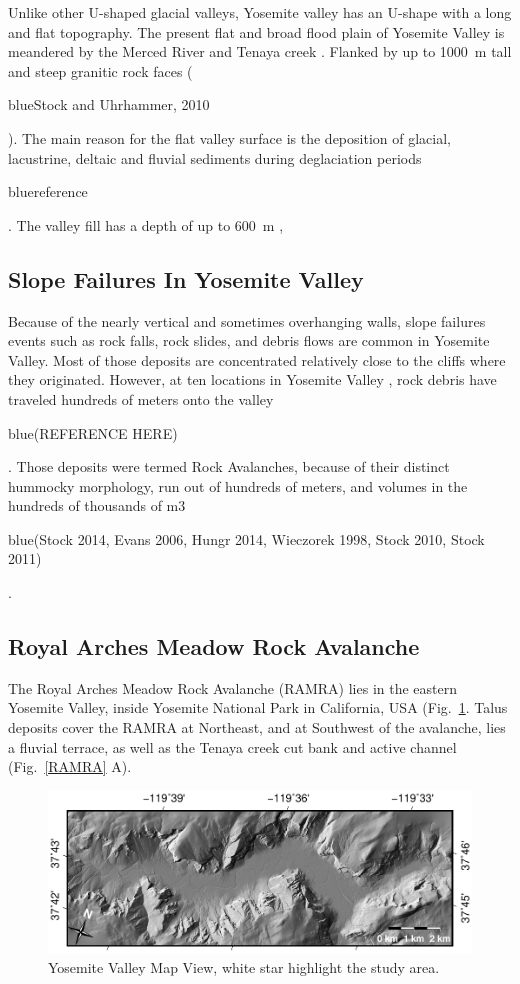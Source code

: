 \documentclass[5p]{elsarticle}
\newcommand{\COMON}{\begin{color}{blue}}
\newcommand{\COMOFF}{\end{color}}
\begin{document}
Unlike other U-shaped glacial valleys, Yosemite valley has an U-shape with a long and flat topography. The present flat and broad flood plain of Yosemite Valley is meandered by the Merced River and Tenaya creek \cite{Wieczorek+1996}. Flanked by up to \SI{1000}{m} tall and steep granitic rock faces (\COMON Stock and Uhrhammer, 2010 \COMOFF). The main reason for the flat valley surface is the deposition of glacial, lacustrine, deltaic and fluvial sediments during deglaciation periods \COMON reference \COMOFF. The valley fill has a depth of up to \SI{600}{m} \cite{gutenberg1956seismic},


    
\subsection{Slope Failures In Yosemite Valley}

Because of  the nearly vertical and sometimes overhanging walls, slope failures events such as rock falls, rock slides, and debris flows are common in Yosemite Valley. Most of those deposits are concentrated relatively close to the cliffs where they originated. However, at ten locations in Yosemite Valley , rock debris have traveled hundreds of meters onto the valley \COMON(REFERENCE HERE)\COMOFF. Those deposits were termed Rock Avalanches, because of their distinct hummocky morphology, run out of hundreds of meters, and volumes in the hundreds of thousands of m3 \COMON(Stock 2014, Evans 2006,  Hungr 2014, Wieczorek 1998, Stock 2010, Stock 2011)\COMOFF. 


\subsection{Royal Arches Meadow Rock Avalanche}\label{sec:introRAMRA}

The Royal Arches Meadow Rock Avalanche (RAMRA) lies in the eastern Yosemite Valley, inside Yosemite National Park in California, USA (Fig.~\ref{Study_Area}. Talus deposits cover the RAMRA at Northeast, and at Southwest of the avalanche, lies a fluvial terrace, as well as the Tenaya creek cut bank and active channel (Fig.~\ref{RAMRA} A). 


								   \begin{figure}[h]

	\includegraphics[width=\textwidth]{Yosemite.pdf}
		\caption{Yosemite Valley Map View, white star highlight the study area.  \label{Study_Area}}

								   \end{figure}
\end{document}
